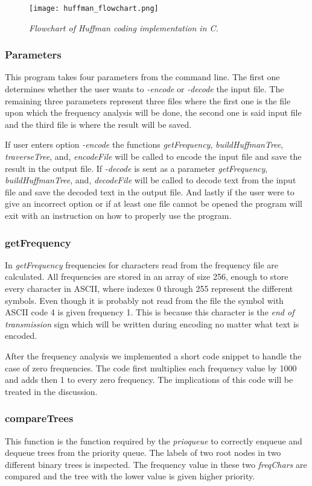 \documentclass[a4paper,11pt,twoside]{article}
\begin{document}
\begin{figure}[h]
\centering
\texttt{[image: huffman\_flowchart.png]}
\caption{\textit{Flowchart of Huffman coding implementation in C.}}
\label{fig:flow}
\end{figure}

\subsubsection{Parameters}
This program takes four parameters from the command line. The first one determines whether the 
user wants to \emph{-encode} or \emph{-decode} the input file. The remaining three parameters represent 
three files where the first one is the file upon which the frequency analysis will be done, the second one is said 
input file and the third file is where the result will be saved. 

If user enters option \emph{-encode} the functions \emph{getFrequency}, \emph{buildHuffmanTree}, \emph{traverseTree}, and, \emph{encodeFile} will be called to encode the input file and save the result in the output file. If \emph{-decode} is sent as a parameter \emph{getFrequency}, \emph{buildHuffmanTree}, and, \emph{decodeFile} will be called to decode text from the input file and save the decoded text in the output file. And lastly if the user were to give an incorrect option or if at least one file cannot be opened the program will exit with an instruction on how to properly use the program.

\subsubsection{getFrequency}
In \emph{getFrequency}  frequencies for characters read from the frequency file are calculated.
All frequencies are stored in an array of size 256, enough to store every character in ASCII, where indexes 0 through 255 
represent the different symbols. Even though it is probably not read
from the file the symbol with ASCII code 4 is given frequency 1. This
is because this character is the \emph{end of transmission} sign which
will be written during encoding no matter what text is encoded. 

After the frequency analysis we implemented a short code snippet to
handle the case of zero frequencies. The code first multiplies each
frequency value by 1000 and adds then 1 to every zero frequency. The
implications of this code will be treated in the discussion.

\subsubsection{compareTrees}
This function is the function required by the \emph{prioqueue} to correctly enqueue and dequeue trees from the priority queue.
The labels of two root nodes in two different binary trees is inspected. The frequency value in these two \emph{freqChars} are compared and the tree with the lower value is given higher priority.
\end{document}
